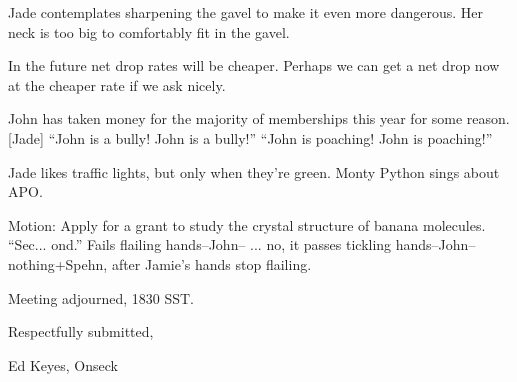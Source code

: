 \documentclass[12pt]{article}
\begin{document}
Jade contemplates sharpening the gavel to make it even more dangerous.
Her neck is too big to comfortably fit in the gavel.

In the future net drop rates will be cheaper.  Perhaps we can get a
net drop now at the cheaper rate if we ask nicely.

John has taken money for the majority of memberships this year for
some reason.  [Jade] ``John is a bully!  John is a bully!''  ``John
is poaching!  John is poaching!''

Jade likes traffic lights, but only when they're green.  Monty
Python sings about APO.

Motion: Apply for a grant to study the crystal structure of banana
molecules.  ``Sec... ond.''  Fails flailing hands--John-- ... no,
it passes tickling hands--John--nothing+Spehn, after Jamie's hands
stop flailing.

\vspace{12pt}

\noindent
Meeting adjourned, 1830 SST.

\vspace{18pt}

\centerline{Respectfully submitted,}
\centerline{Ed Keyes, Onseck}
\end{document}
